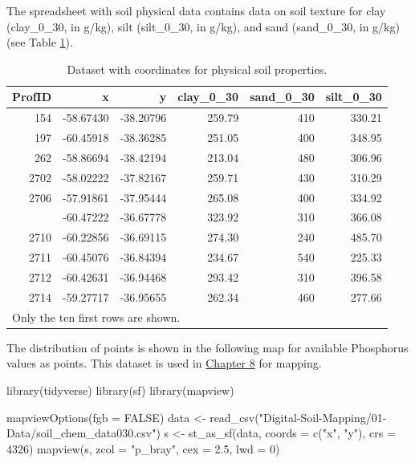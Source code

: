 \documentclass[
  10pt,
  b5paper,
  oneside]{book}
\newenvironment{Shaded}{\begin{snugshade}}{\end{snugshade}}
\newcommand{\AttributeTok}[1]{\textcolor[rgb]{0.77,0.63,0.00}{#1}}
\newcommand{\ConstantTok}[1]{\textcolor[rgb]{0.00,0.00,0.00}{#1}}
\newcommand{\DecValTok}[1]{\textcolor[rgb]{0.00,0.00,0.81}{#1}}
\newcommand{\FloatTok}[1]{\textcolor[rgb]{0.00,0.00,0.81}{#1}}
\newcommand{\FunctionTok}[1]{\textcolor[rgb]{0.00,0.00,0.00}{#1}}
\newcommand{\NormalTok}[1]{#1}
\newcommand{\OtherTok}[1]{\textcolor[rgb]{0.56,0.35,0.01}{#1}}
\newcommand{\StringTok}[1]{\textcolor[rgb]{0.31,0.60,0.02}{#1}}
\begin{document}
The spreadsheet with soil physical data contains data on soil texture for clay (clay\_0\_30, in g/kg), silt (silt\_0\_30, in g/kg), and sand (sand\_0\_30, in g/kg) (see Table \ref{tab:table22}).

\begin{table}

\caption{\label{tab:table22}Dataset with coordinates for physical soil properties.}
\centering
\begin{tabular}[t]{rrrrrr}
\toprule
ProfID & x & y & clay\_0\_30 & sand\_0\_30 & silt\_0\_30\\
\midrule
154 & -58.67430 & -38.20796 & 259.79 & 410 & 330.21\\
197 & -60.45918 & -38.36285 & 251.05 & 400 & 348.95\\
262 & -58.86694 & -38.42194 & 213.04 & 480 & 306.96\\
2702 & -58.02222 & -37.82167 & 259.71 & 430 & 310.29\\
2706 & -57.91861 & -37.95444 & 265.08 & 400 & 334.92\\
\addlinespace
2709 & -60.47222 & -36.67778 & 323.92 & 310 & 366.08\\
2710 & -60.22856 & -36.69115 & 274.30 & 240 & 485.70\\
2711 & -60.45076 & -36.84394 & 234.67 & 540 & 225.33\\
2712 & -60.42631 & -36.94468 & 293.42 & 310 & 396.58\\
2714 & -59.27717 & -36.95655 & 262.34 & 460 & 277.66\\
\bottomrule
\multicolumn{6}{l}{\rule{0pt}{1em}Only the ten first rows are shown.}\\
\end{tabular}
\end{table}

The distribution of points is shown in the following map for available Phosphorus values as points. This dataset is used in \href{https://fao-gsp.github.io/GSNmap-TM/step-3-mapping-continuous-soil-properties.html}{Chapter 8} for mapping.

\begin{Shaded}
\begin{Highlighting}[]
\FunctionTok{library}\NormalTok{(tidyverse)}
\FunctionTok{library}\NormalTok{(sf)}
\FunctionTok{library}\NormalTok{(mapview)}

\FunctionTok{mapviewOptions}\NormalTok{(}\AttributeTok{fgb =} \ConstantTok{FALSE}\NormalTok{)}
\NormalTok{data }\OtherTok{\textless{}{-}} \FunctionTok{read\_csv}\NormalTok{(}\StringTok{"Digital{-}Soil{-}Mapping/01{-}Data/soil\_chem\_data030.csv"}\NormalTok{)}
\NormalTok{s }\OtherTok{\textless{}{-}} \FunctionTok{st\_as\_sf}\NormalTok{(data, }\AttributeTok{coords =} \FunctionTok{c}\NormalTok{(}\StringTok{"x"}\NormalTok{, }\StringTok{"y"}\NormalTok{), }\AttributeTok{crs =} \DecValTok{4326}\NormalTok{)}
\FunctionTok{mapview}\NormalTok{(s, }\AttributeTok{zcol =} \StringTok{"p\_bray"}\NormalTok{, }\AttributeTok{cex =} \FloatTok{2.5}\NormalTok{, }\AttributeTok{lwd =} \DecValTok{0}\NormalTok{)}
\end{Highlighting}
\end{Shaded}
\end{document}

